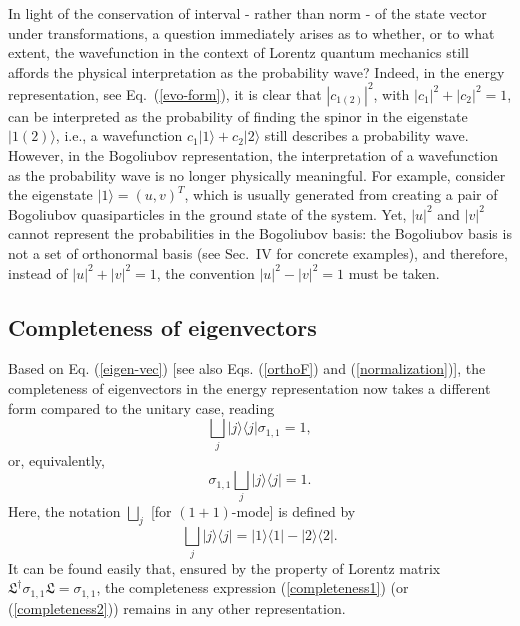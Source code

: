 \documentclass[pra,epsfig,rotate,superscriptaddress,showpacs]{revtex4}
\begin{document}
In light of the conservation of interval - rather than norm - of the state vector under transformations, a question immediately arises as to whether, or to what extent, the wavefunction in the context of Lorentz quantum mechanics still affords the physical interpretation as the probability wave? Indeed, in the energy representation, see Eq.~(\ref{evo-form}), it is clear that $|c_{1(2)}|^2$, with $|c_1|^2+|c_2|^2=1$, can be interpreted as the probability of finding the spinor in the eigenstate $|1(2)\rangle$, i.e., a wavefunction $c_1|1\rangle+c_2|2\rangle$ still describes a probability wave. However, in the Bogoliubov representation, the interpretation of a wavefunction as the probability wave is no longer physically meaningful. For example, consider the eigenstate $|1\rangle=(u,v)^T$, which is usually generated from creating a pair of Bogoliubov quasiparticles in the ground state of the system. Yet, $|u|^2$ and $|v|^2$ cannot represent the probabilities in the Bogoliubov basis: the Bogoliubov basis is not a set of orthonormal basis (see Sec.~IV for concrete examples), and therefore, instead of $|u|^2+|v|^2=1$, the convention $|u|^2-|v|^2=1$ must be taken.

\subsection{Completeness of eigenvectors}
Based on Eq. (\ref{eigen-vec}) [see also Eqs. (\ref{orthoF}) and (\ref{normalization})], the completeness of eigenvectors in the energy representation now takes a different form compared to the unitary case, reading
\begin{equation} \label{completeness1}
\bigsqcup_{j} |j\rangle\langle j| \sigma_{1,1}=1,
\end{equation}
or, equivalently,
\begin{equation} \label{completeness2}
\sigma_{1,1} \bigsqcup_{j}  |j\rangle\langle j|=1.
\end{equation}
Here, the notation $\bigsqcup_j$ [for $(1+1)$-mode] is defined by
\begin{equation}
 \bigsqcup_{j}  |j\rangle\langle j|=|1\rangle\langle 1|-|2\rangle\langle 2|.
\end{equation}
It can be found easily that, ensured by the property of Lorentz matrix $\mathfrak{L}^\dag \sigma_{1,1}\mathfrak{L}=\sigma_{1,1}$, the completeness expression (\ref{completeness1}) (or (\ref{completeness2})) remains in any other representation.
\end{document}
